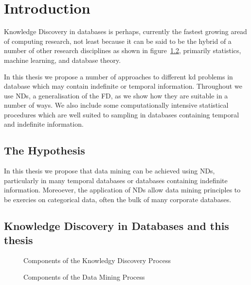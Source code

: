 \chapter{Introduction}\label{chap:intro}

Knowledge Discovery in databases is perhaps, currently the fastest
growing aread of computing research, not least because it can be said
to be the hybrid of a number of other research disciplines as shown in
figure~\ref{fig:dm_process}, primarily statistics, machine learning,
and database theory.

\medskip

In this thesis we propose a number of approaches to different kd
problems in database which may contain indefinite or temporal
information. Throughout we use NDs, a generalisation of the FD, as we
show how they are suitable in a number of ways.  We also include some
computationally intensive statistical procedures which are well suited
to sampling in databases containing temporal and indefinite information.


\section{The Hypothesis}

In this thesis we propose that data mining can be achieved using NDs,
particularly in many temporal databases or databases containing
indefinite information. Moreoever, the application of NDs allow data
mining principles to be exercies on categorical data, often the bulk
of many corporate databases.

\section{Knowledge Discovery in Databases and this thesis}

\begin{figure}
\centerline{}
\caption{\label{fig:kdd_component}Components of the
         Knowledgy Discovery Process}
\end{figure}
 
\begin{figure}
\centerline{}
\caption{\label{fig:dm_process}Components of the Data
Mining Process}
\end{figure}
  
